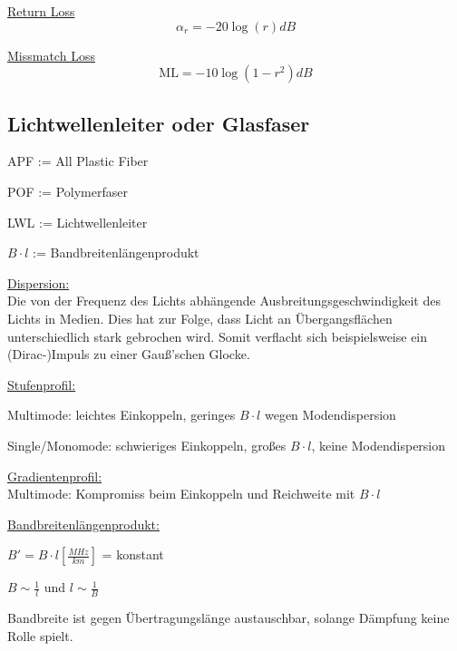 \underline{Return Loss}
\[
	\alpha_r = -20\log(r)dB
\]

\underline{Missmatch Loss}
\[
	\mathrm{ML} = -10\log(1-r^2)dB
\]

\subsection{Lichtwellenleiter oder Glasfaser}
\begin{description}
	\setlength\itemsep{1pt}
	\item APF := All Plastic Fiber
	\item POF := Polymerfaser
	\item LWL := Lichtwellenleiter
	\item $B\cdot l$ := Bandbreitenlängenprodukt
\end{description}

\begin{description}
	\item \underline{Dispersion:}\\
	      {\small Die von der Frequenz des Lichts abhängende
	      Ausbreitungsgeschwindigkeit des Lichts in Medien. Dies hat zur Folge,
	      dass Licht an Übergangsflächen unterschiedlich stark gebrochen wird.
	      Somit verflacht sich beispielsweise ein (Dirac-)Impuls zu einer Gauß'schen
	      Glocke.
	      }

	\item \underline{Stufenprofil:}\\
	      {\small Multimode: leichtes Einkoppeln, geringes $B\cdot l$ wegen
	      Modendispersion

	      Single/Monomode: schwieriges Einkoppeln, großes $B\cdot l$, keine
	      Modendispersion
	      }

	\item \underline{Gradientenprofil:}\\
	      {\small Multimode: Kompromiss beim Einkoppeln und Reichweite mit $B\cdot l$}

	\item \underline{Bandbreitenlängenprodukt:}\\
	      {\small $B' =  B\cdot l[\frac{MHz}{km}]$ = konstant

	      $B \sim \frac{1}{l}$ und $l\sim \frac{1}{B}$

	      Bandbreite ist gegen Übertragungslänge austauschbar, solange
	      Dämpfung keine Rolle spielt.
	      }
\end{description}

